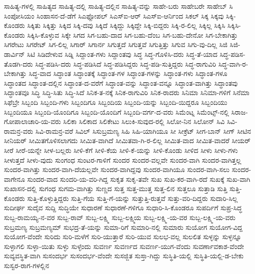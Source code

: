 {ಸಾಹಿತ್ಯ-ಗಳಲ್ಲಿ
ಸಾಹಿತ್ಯದ
ಸಾಹಿತ್ಯ-ದಲ್ಲಿ
ಸಾಹಿತ್ಯ-ದಲ್ಲಿನ
ಸಾಹಿತ್ಯ-ವನ್ನು
ಸಾಹೇ-ಬರು
ಸಾಹೇಬರೇ
ಸಾಹೇಬ್
ಸಿ
ಸಿಂಪೋಸಿಯಂ
ಸಿಂಹಾಸನ-ದೆ-ಡೆಗೆ
ಸಿಎಫ್ಪೋಪಲ್
ಸಿಎಸ್ಐ-ಆರ್
ಸಿಎಸ್ಐ-ಆರ್ನಿಂದ
ಸಿಕಲ್
ಸಿಕ್ಕ
ಸಿಕ್ಕವು
ಸಿಕ್ಕಿ-ಕೊಂಡರು
ಸಿಕ್ಕಿತು
ಸಿಕ್ಕಿತ್ತು
ಸಿಕ್ಕಿದ
ಸಿಕ್ಕಿ-ದವು
ಸಿಕ್ಕಿದೆ
ಸಿಕ್ಕಿದ್ದು
ಸಿಕ್ಕಿದ್ದೇ
ಸಿಕ್ಕಿ-ಬಿದ್ದರು
ಸಿಕ್ಕಿ-ರ-ಲಿಲ್ಲ
ಸಿಕ್ಕಿಲ್ಲ
ಸಿಕ್ಕಿಸಿ
ಸಿಕ್ಕಿಸಿ-ಕೊಂಡರು
ಸಿಕ್ಕಿಸಿ-ಕೊಳ್ಳುವ
ಸಿಕ್ಕೇ
ಸಿಗದ
ಸಿಗ-ಬಹು-ದಾದ
ಸಿಗ-ಬಹು-ದೆಂಬ
ಸಿಗ-ಬಹು-ದೇನೋ
ಸಿಗ-ಬೇಕಾಗಿತ್ತು
ಸಿಗರೇಟು
ಸಿಗರೇಟ್
ಸಿಗ-ಲಿಲ್ಲ
ಸಿಗಾರ್
ಸಿಗಾರ್ನ
ಸಿಗುತ್ತದೆ
ಸಿಗುತ್ತವೆ
ಸಿಗುತ್ತಿತ್ತು
ಸಿಗುವ
ಸಿಗು-ವು-ದಿಲ್ಲ
ಸಿಜಿ
ಸಿಜಿ-ಡಾರ್ವಿನ್
ಸಿಟಿ
ಸಿಡಿದೇಳುವ
ಸಿಡ್ನಿ
ಸಿದ್ದಾಂತ-ಗಳು
ಸಿದ್ದಾಂತವು
ಸಿದ್ಧ
ಸಿದ್ಧ-ಗೊಳಿಸಿ-ದರು
ಸಿದ್ಧ-ತೆ-ಯಾದ
ಸಿದ್ಧ-ಪಡಿಸ-ತೊಡಗಿ-ದರು
ಸಿದ್ಧ-ಪಡಿಸಿ-ದರು
ಸಿದ್ಧ-ಪಡಿಸಿದೆ
ಸಿದ್ಧ-ಪಡಿಸಿದ್ದರು
ಸಿದ್ಧ-ಪಡಿ-ಸುತ್ತಿದ್ದರು
ಸಿದ್ಧ-ರಾಗುವಿರಿ
ಸಿದ್ಧ-ವಾಗಿ-ರ-ಬೇಕಾಗಿತ್ತು
ಸಿದ್ಧ-ವಾದ
ಸಿದ್ಧಾಂತ
ಸಿದ್ಧಾಂತಕ್ಕೆ
ಸಿದ್ಧಾಂತ-ಗಳ
ಸಿದ್ಧಾಂತ-ಗಳನ್ನು
ಸಿದ್ಧಾಂತ-ಗಳು
ಸಿದ್ಧಾಂತ-ಗಳೂ
ಸಿದ್ಧಾಂತದ
ಸಿದ್ಧಾಂತ-ದಲ್ಲಿನ
ಸಿದ್ಧಾಂತ-ದ-ವರೆಗೆ
ಸಿದ್ಧಾಂತ-ವನ್ನು
ಸಿದ್ಧಾಂತ-ವನ್ನೂ
ಸಿದ್ಧಾಂತ-ವಾಗಿತ್ತು
ಸಿದ್ಧಾಂತವು
ಸಿದ್ಧಾಂತವೂ
ಸಿದ್ಧಿ
ಸಿದ್ಧಿ-ಸಿತು
ಸಿದ್ಧಿ-ಸಿದೆ
ಸಿನಿಕ-ತ-ನಕ್ಕೆ
ಸಿನಿಕ-ರಾಗುವಿರಿ
ಸಿನಿಕ-ರಾದರು
ಸಿನಿಮಾ
ಸಿನಿಮಾ-ಗಳಿಗೆ
ಸಿನೆಮಾ
ಸಿಫೆಬ್ರೇ
ಸಿಬ್ಬಂದಿ
ಸಿಬ್ಬಂದಿ-ಗಳು
ಸಿಬ್ಬಂದಿಗೂ
ಸಿಬ್ಬಂದಿಯ
ಸಿಬ್ಬಂದಿ-ಯನ್ನು
ಸಿಬ್ಬಂದಿ-ಯಿದ್ದರೂ
ಸಿಬ್ಬಂದಿಯು
ಸಿಬ್ಬಂದಿಯೂ
ಸಿಬ್ಬಂದಿ-ಯೊಂದಿಗೂ
ಸಿಬ್ಬಂದಿ-ಯೊಂದಿಗೆ
ಸಿಬ್ಬಂದಿ-ವರ್ಗ-ದ-ವರು
ಸಿಮೆಂಟ್ನ
ಸಿಮೆಂಟ್ಸ್-ನಲ್ಲಿ
ಸಿರಾಜ-ಗೋಪಾಲಾಚಾರಿ-ಯ-ವರು
ಸಿಲಿಕಾ
ಸಿಲಿಕಾದ
ಸಿಲಿಕೇಟು
ಸಿಲುಕಿ-ಸುವುದ-ರಲ್ಲಿ
ಸಿಲೋ-ನಿನ
ಸಿಲೋನ್
ಸಿವಿ
ಸಿವಿ-ರಾಮನ್ರ-ವರು
ಸಿವಿ-ರಾಮನ್ರ-ವರೆ
ಸಿವಿಲ್
ಸಿಸುಬ್ರಮಣ್ಯ
ಸಿಹಿ
ಸಿಹಿ-ಯಾಗಿಯೂ
ಸೀ
ಸೀಕ್ರೆಟ್
ಸೀಗ-ಬಾನ್
ಸೀಗ್
ಸೀಟಿನ
ಸೀನಿಯರ್
ಸೀಮಿತಗೊಳಿಸಲಾಗದು
ಸೀಮಿತ-ವಾಗಿದೆ
ಸೀಮಿತವಾ-ಗಿ-ರ-ಲಿಲ್ಲ
ಸೀಮಿತ-ವಾದ
ಸೀಮಿತ-ವಾದರೆ
ಸೀಯರ್
ಸೀರೆ
ಸೀರೆ-ಯನ್ನೇ
ಸೀಳ-ಬಲ್ಲರು
ಸೀಳಿ-ಕೆಗೆ
ಸೀಳಿ-ಕೆಯ
ಸೀಳಿ-ಕೆ-ಯನ್ನು
ಸೀಳಿ-ಕೊಂಡು
ಸೀಳಿದ
ಸೀಳು
ಸೀಳು-ಗಳು
ಸೀಳುತ್ತದೆ
ಸೀಳು-ವುದು
ಸುಂಗಂಧ
ಸುಂಟರ-ಗಾಳಿಗೆ
ಸುಂದರ
ಸುಂದರ-ವಲ್ಲವೇ
ಸುಂದರ-ವಾಗಿ
ಸುಂದರ-ವಾಗಿತ್ತಲ್ಲ
ಸುಂದರ-ವಾಗಿತ್ತು
ಸುಂದರ-ವಾಗಿ-ದೆಯಲ್ಲವೇ
ಸುಂದರ-ವಾಗಿದ್ದವು
ಸುಂದರ-ವಾಗಿಯೂ
ಸುಂದರ-ವಾಗಿ-ಸಲು
ಸುಂದರ-ವಾಗೇನೂ
ಸುಂದರ-ವಾದ
ಸುಂದರಿ-ಯ-ವರಿ-ಗಿದ್ದ
ಸುಕೃತ
ಸುಕೃ-ತವೇ
ಸುಖ
ಸುಖ-ಕರ-ವಾಗಿ-ರದೆ
ಸುಖಕ್ಕೆ
ಸುಖ-ವಾಗಿ
ಸುಖಾಸನ-ದಲ್ಲಿ
ಸುಗಂಧ
ಸುಗಮ-ವಾಗಿತ್ತು
ಸುಣ್ಣದ
ಸುತ್ತ
ಸುತ್ತ-ಮುತ್ತ
ಸುತ್ತ-ಲಿನ
ಸುತ್ತಲೂ
ಸುತ್ತಾಡಿ
ಸುತ್ತಿ
ಸುತ್ತಿ-ಕೊಂಡರು
ಸುತ್ತಿ-ಕೊಳ್ಳುತ್ತಿದ್ದರು
ಸುತ್ತಿ-ಗೆಯ
ಸುತ್ತಿ-ಗೆ-ಯನ್ನು
ಸುತ್ತುತ್ತಿ-ರುತ್ತವೆ
ಸುತ್ತು-ವರಿ-ದಿದ್ದರು
ಸುದಾರಿ-ಸಿಲ್ಲ
ಸುದೀರ್ಘ
ಸುದೈವ
ಸುದ್ದಿ
ಸುದ್ಧಿಯೇ
ಸುಧಾರಣೆ
ಸುಧಾರಣೆ-ಗಳಿಗೂ
ಸುಧಾರಿ-ಸಿ-ಕೊಂಡರೂ
ಸುಪರ್ದಿಗೆ
ಸುಪ್ರ-ಸಿದ್ಧ
ಸುಬ್ಬ-ರಾಮಯ್ಯ-ನ-ವರ
ಸುಬ್ಬ-ರಾವ್
ಸುಬ್ಬ-ಲಕ್ಷ್ಮಿ
ಸುಬ್ಬ-ಲಕ್ಷ್ಮಿಯ
ಸುಬ್ಬ-ಲಕ್ಷ್ಮಿ-ಯ-ವರ
ಸುಬ್ಬ-ಲಕ್ಷ್ಮಿ-ಯ-ವರು
ಸುಬ್ರಮಣ್ಯ
ಸುಬ್ರಮಣ್ಯಮ್
ಸುಭದ್ರ-ತೆ-ಯನ್ನು
ಸುಮಾ-ರಿಗೆ
ಸುಮಾರಿ-ನಲ್ಲಿ
ಸುಮಾರು
ಸುಯೋಗ
ಸುಯೋಗ-ವಿದ್ದ
ಸುಯೋಗ-ವೆಂದೇ
ಸುರಿದು
ಸುರಿ-ಮಳೆಗೆ
ಸುರಿ-ಯುತ್ತಾರೆ
ಸುರಿ-ಯುವ
ಸುಲಭ-ವಲ್ಲ
ಸುಲಲಿತ
ಸುಳ್ಳನ್ನು
ಸುಳ್ಳನ್ನೂ
ಸುಳ್ಳಾಗಲಿ
ಸುಳ್ಳಾ-ಯಿತು
ಸುಳ್ಳು
ಸುಳ್ಳೆಂದು
ಸುವರ್ಣ
ಸುವರ್ಣದ
ಸುವರ್ಣ-ಯುಗ-ವೆಂದು
ಸುವರ್ಣಾವಕಾಶ-ವೆಂದೇ
ಸುವ್ಯವಸ್ಥಿತ-ವಾಗಿ
ಸುಸಂದರ್ಭ
ಸುಸಂದರ್ಭ-ವೆಂದೇ
ಸುಸಜ್ಜಿತ
ಸುಸ್ತಾ-ಗಿದ್ದು
ಸುಸ್ಥಿತಿ-ಯಲ್ಲಿ
ಸುಸ್ಥಿತಿ-ಯಲ್ಲಿ-ಡ-ಬೇಕು
ಸುಸ್ವರ-ರಾಗ-ಗಳಲ್ಲಿನ
}

